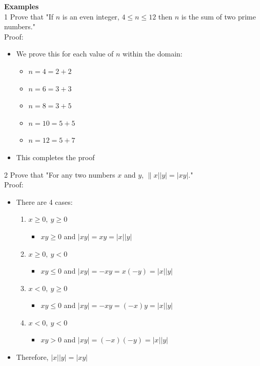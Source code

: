 \documentclass[12pt, letterpaper]{article}
\newcommand{\exheader}[1][ex]{{\tiny{#1}\normalsize}}
\begin{document}
\textbf{Examples} \\
\exheader[1] Prove that "If $n$ is an even integer, $4 \le n \le 12$ then $n$ is the sum of two prime numbers." \\ Proof:
\vspace*{-0.25cm}
\begin{itemize}[leftmargin=*, label={}]
	\item We prove this for each value of $n$ within the domain:
	\begin{itemize}
		\item $n = 4 = 2 + 2$
		\item $n = 6 = 3 + 3$
		\item $n = 8 = 3 + 5$
		\item $n = 10 = 5 + 5$
		\item $n = 12 = 5 + 7$
	\end{itemize}
	\item This completes the proof
\end{itemize}
\bigbreak
\exheader[2] Prove that "For any two numbers $x$ and $y$, $\|x||y| = |xy|$." \\ Proof:
\vspace*{-0.25cm}
\begin{itemize}[leftmargin=*, label={}]
	\item There are 4 cases:
	\begin{enumerate}
		\item $ x \ge 0, \ y \ge 0$
		\begin{itemize}
			\item $xy \ge 0$ and $|xy| = xy = |x||y|$
		\end{itemize}
		\item $ x \ge 0, \ y < 0$
		\begin{itemize}
			\item $xy \le 0$ and $|xy| = -xy = x(-y) = |x||y|$
		\end{itemize}
		\item $ x < 0, \ y \ge 0$
		\begin{itemize}
			\item $xy \le 0$ and $|xy| = -xy = (-x)y = |x||y|$
		\end{itemize}
		\item $ x < 0, \ y < 0$
		\begin{itemize}
			\item $xy > 0$ and $|xy| = (-x)(-y) = |x||y|$
		\end{itemize}
	\end{enumerate}
	\item Therefore, $|x||y| = |xy|$
\end{itemize}
\end{document}
